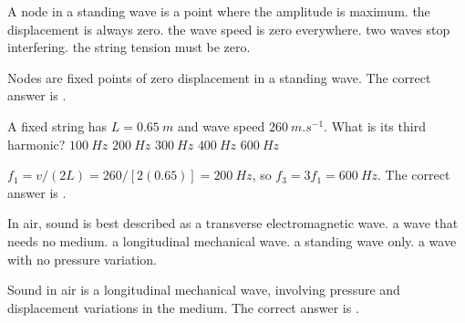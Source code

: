 \documentclass[full,print,11pt,a4paper]{physicsquiz}
\begin{document}
\begin{quizbank}
  \begin{quizquestion}[
    id=ow-standing-019,
    topic=standing-waves,
    difficulty=foundation,
    marks=1,
    correct=B,
    tags={nodes,antinodes},
    outcome={Define a node in a standing wave}
  ]
    A node in a standing wave is a point where
    \choices
      {the amplitude is maximum.}
      {the displacement is always zero.}
      {the wave speed is zero everywhere.}
      {two waves stop interfering.}
      {the string tension must be zero.}
  \end{quizquestion}
  \begin{quizsolution}
    Nodes are fixed points of zero displacement in a standing wave. The correct
    answer is \quizcorrectletter.
  \end{quizsolution}

  \begin{quizquestion}[
    id=ow-standing-020,
    topic=standing-waves,
    difficulty=applied,
    marks=1,
    correct=E,
    tags={harmonics,string},
    outcome={Compute fixed-string resonant frequencies}
  ]
    A fixed string has \(L=\SI{0.65}{m}\) and wave speed
    \(\SI{260}{m.s^{-1}}\). What is its third harmonic?
    \choices
      {\(\SI{100}{Hz}\)}
      {\(\SI{200}{Hz}\)}
      {\(\SI{300}{Hz}\)}
      {\(\SI{400}{Hz}\)}
      {\(\SI{600}{Hz}\)}
  \end{quizquestion}
  \begin{quizsolution}
    \(f_1=v/(2L)=260/[2(0.65)]=\SI{200}{Hz}\), so
    \(f_3=3f_1=\SI{600}{Hz}\). The correct answer is \quizcorrectletter.
  \end{quizsolution}

  \begin{quizquestion}[
    id=ow-sound-021,
    topic=sound-waves,
    difficulty=foundation,
    marks=1,
    correct=C,
    tags={sound,longitudinal},
    outcome={Identify sound as a longitudinal mechanical wave}
  ]
    In air, sound is best described as
    \choices
      {a transverse electromagnetic wave.}
      {a wave that needs no medium.}
      {a longitudinal mechanical wave.}
      {a standing wave only.}
      {a wave with no pressure variation.}
  \end{quizquestion}
  \begin{quizsolution}
    Sound in air is a longitudinal mechanical wave, involving pressure and
    displacement variations in the medium. The correct answer is
    \quizcorrectletter.
  \end{quizsolution}


\end{quizbank}
\end{document}
